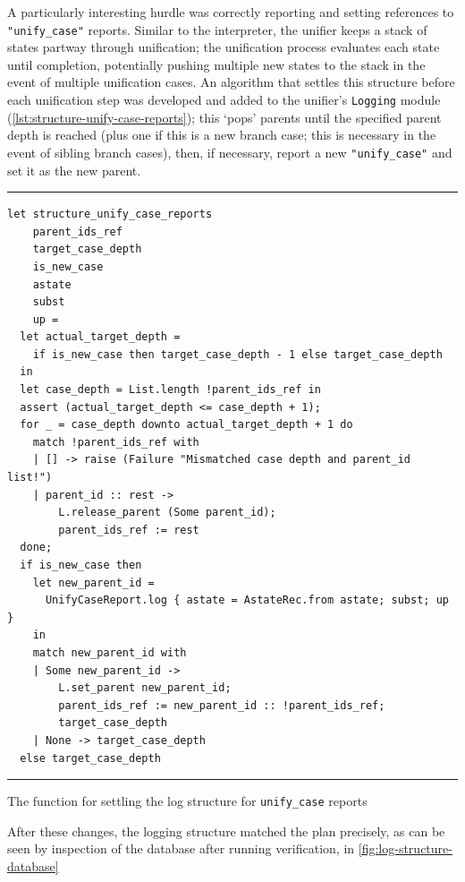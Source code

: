 A particularly interesting hurdle was correctly reporting and setting references
to \texttt{"unify\_case"} reports. Similar to the interpreter, the unifier keeps
a stack of states partway through unification; the unification process evaluates
each state until completion, potentially pushing multiple new states to the
stack in the event of multiple unification cases. An algorithm that settles this
structure before each unification step was developed and added to the unifier's
\texttt{Logging} module (\autoref{lst:structure-unify-case-reports}); this
`pops' parents until the specified parent depth is reached (plus one if this
is a new branch case; this is necessary in the event of sibling branch cases),
then, if necessary, report a new \texttt{"unify\_case"} and set it as the new
parent.

\begin{listing}[!ht]
\noindent\rule{\textwidth}{0.5pt}
\vspace{-0.6cm}
\begin{verbatim}
let structure_unify_case_reports
    parent_ids_ref
    target_case_depth
    is_new_case
    astate
    subst
    up =
  let actual_target_depth =
    if is_new_case then target_case_depth - 1 else target_case_depth
  in
  let case_depth = List.length !parent_ids_ref in
  assert (actual_target_depth <= case_depth + 1);
  for _ = case_depth downto actual_target_depth + 1 do
    match !parent_ids_ref with
    | [] -> raise (Failure "Mismatched case depth and parent_id list!")
    | parent_id :: rest ->
        L.release_parent (Some parent_id);
        parent_ids_ref := rest
  done;
  if is_new_case then
    let new_parent_id =
      UnifyCaseReport.log { astate = AstateRec.from astate; subst; up }
    in
    match new_parent_id with
    | Some new_parent_id ->
        L.set_parent new_parent_id;
        parent_ids_ref := new_parent_id :: !parent_ids_ref;
        target_case_depth
    | None -> target_case_depth
  else target_case_depth
\end{verbatim}
\vspace{-0.4cm}
\noindent\rule{\textwidth}{0.5pt}
\vspace{-0.6cm}
\caption{The function for settling the log structure for \texttt{unify\_case} reports}
\label{lst:structure-unify-case-reports}
\end{listing}

After these changes, the logging structure matched the plan precisely, as can be
seen by inspection of the database after running verification, in
\autoref{fig:log-structure-database}

